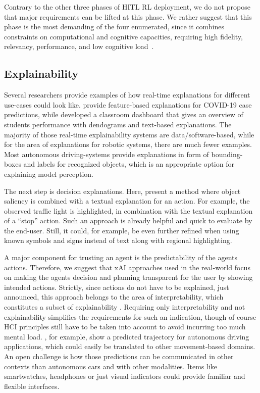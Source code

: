 \documentclass[twoside,11pt]{article}
\begin{document}
Contrary to the other three phases of HITL RL deployment, we do not propose that major requirements can be lifted at this phase. We rather suggest that this phase is the most demanding of the four enumerated, since it combines constraints on computational and cognitive capacities, requiring high fidelity, relevancy, performance, and low cognitive load~\citep{milani2022survey}.

\subsection{Explainability}

Several researchers provide examples of how real-time explanations for different use-cases could look like. \citet{RodriguezEtAl:2021:DeepCovidxAI} provide feature-based explanations for COVID-19 case predictions, while \citet{Kulkarni:2021:EducationAIDashboard} developed a classroom dashboard that gives an overview of students performance with dendograms and text-based explanations. The majority of those real-time explainability systems are data/software-based, while for the area of explanations for robotic systems, there are much fewer examples. Most autonomous driving-systems provide explanations in form of bounding-boxes and labels for recognized objects, which is an appropriate option for explaining model perception. 

The next step is decision explanations. Here, \citet{Ben-YounesEtAl:2022:DrivingBehaviorEx} present a method where object saliency is combined with a textual explanation for an action. For example, the observed traffic light is highlighted, in combination with the textual explanation of a ``stop'' action. Such an approach is already helpful and quick to evaluate by the end-user. Still, it could, for example, be even further refined when using known symbols and signs instead of text along with regional highlighting.

A major component for trusting an agent is the predictability of the agents actions. Therefore, we suggest that xAI approaches used in the real-world focus on making the agents decision and planning transparent for the user by showing intended actions. Strictly, since actions do not have to be explained, just announced, this approach belongs to the area of interpretability, which constitutes a subset of explainability \citep{Dragan:2015:LegibleRobotMotion}. Requiring only interpretability and not explainability simplifies the requirements for such an indication, though of course HCI principles still have to be taken into account to avoid incurring too much mental load. \citet{Caltagarione:2017:DrivingPathGeneration}, for example, show a predicted trajectory for autonomous driving applications, which could easily be translated to other movement-based domains. 
An open challenge is how those predictions can be communicated in other contexts than autonomous cars and with other modalities. Items like smartwatches, headphones or just visual indicators could provide familiar and flexible interfaces.
\end{document}
